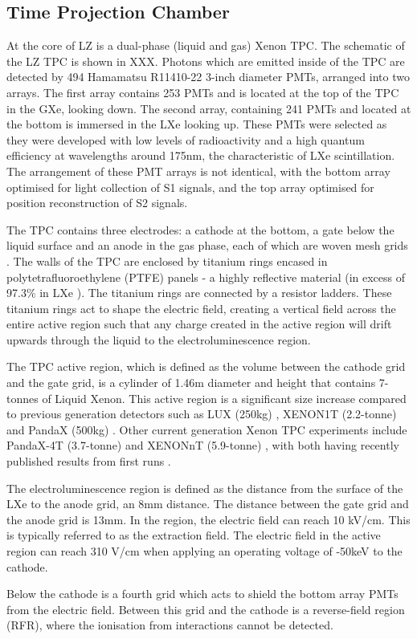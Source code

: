 \subsection{Time Projection Chamber}
\label{sec:lz_tpc}
\par
At the core of LZ is a dual-phase (liquid and gas) Xenon TPC.
The schematic of the LZ TPC is shown in XXX.
Photons which are emitted inside of the TPC are detected by 494 Hamamatsu R11410-22 3-inch diameter PMTs, arranged into two arrays.
The first array contains 253 PMTs and is located at the top of the TPC in the GXe, looking down.
The second array, containing 241 PMTs and located at the bottom is immersed in the LXe looking up.
These PMTs were selected as they were developed with low levels of radioactivity and a high quantum efficiency at wavelengths around 175nm, the characteristic of LXe scintillation.
The arrangement of these PMT arrays is not identical, with the bottom array optimised for light collection of S1 signals, and the top array optimised for position reconstruction of S2 signals.
\par
The TPC contains three electrodes: a cathode at the bottom, a gate below the liquid surface and an anode in the gas phase, each of which are woven mesh grids \cite{lz_grids_ref}.
The walls of the TPC are enclosed by titanium rings encased in polytetrafluoroethylene (PTFE) panels - a highly reflective material (in excess of 97.3\% in LXe \cite{ptfe_lxe_reflectivity_ref}).
The titanium rings are connected by a resistor ladders.
These titanium rings act to shape the electric field, creating a vertical field across the entire active region such that any charge created in the active region will drift upwards through the liquid to the electroluminescence region.
\par
The TPC active region, which is defined as the volume between the cathode grid and the gate grid, is a cylinder of 1.46m diameter and height that contains 7-tonnes of Liquid Xenon.
This active region is a significant size increase compared to previous generation detectors such as LUX (250kg) \cite{lux_ref}, XENON1T (2.2-tonne) \cite{xenon1t_ref} and PandaX (500kg) \cite{pandax_ref}.
Other current generation Xenon TPC experiments include PandaX-4T (3.7-tonne) \cite{pandax_4t_ref} and XENONnT (5.9-tonne) \cite{xenonnt_projected_sensitivty_ref}, with both having recently published results from first runs \cite{pandax_4t_sr1_ref,xenonnt_sr1_er_ref}. 
\par
The electroluminescence region is defined as the distance from the surface of the LXe to the anode grid, an 8mm distance.
The distance between the gate grid and the anode grid is 13mm.
In the region, the electric field can reach 10 kV/cm.
This is typically referred to as the extraction field.
The electric field in the active region can reach 310 V/cm when applying an operating voltage of -50keV to the cathode.
\par
Below the cathode is a fourth grid which acts to shield the bottom array PMTs from the electric field.
Between this grid and the cathode is a reverse-field region (RFR), where the ionisation from interactions cannot be detected.


